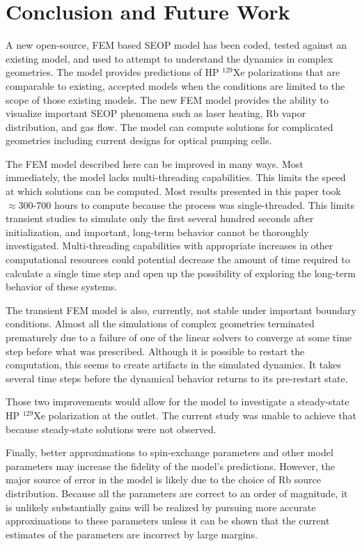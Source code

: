 \section{Conclusion and Future Work\label{sec:conclusion}}
A new open-source, FEM based SEOP model has been coded, tested against an existing model, and used to attempt to understand the dynamics in complex geometries. The model provides predictions of HP $^{129}$Xe polarizations that are comparable to existing, accepted models when the conditions are limited to the scope of those existing models. The new FEM model provides the ability to visualize important SEOP phenomena such as laser heating, Rb vapor distribution, and gas flow. The model can compute solutions for complicated geometries including current designs for optical pumping cells.

The FEM model described here can be improved in many ways. Most immediately, the model lacks multi-threading capabilities. This limits the speed at which solutions can be computed. Most results presented in this paper took $\approx$300-700 hours to compute because the process was single-threaded. This limits transient studies to simulate only the first several hundred seconds after initialization, and important, long-term behavior cannot be thoroughly investigated. Multi-threading capabilities with appropriate increases in other computational resources could potential decrease the amount of time required to calculate a single time step and open up the possibility of exploring the long-term behavior of these systems.

The transient FEM model is also, currently, not stable under important boundary conditions. Almost all the simulations of complex geometries terminated prematurely due to a failure of one of the linear solvers to converge at some time step before what was prescribed. Although it is possible to restart the computation, this seems to create artifacts in the simulated dynamics. It takes several time steps before the dynamical behavior returns to its pre-restart state. 

Those two improvements would allow for the model to investigate a steady-state HP $^{129}$Xe polarization at the outlet. The current study was unable to achieve that because steady-state solutions were not observed.

Finally, better approximations to spin-exchange parameters and other model parameters may increase the fidelity of the model's predictions. However, the major source of error in the model is likely due to the choice of Rb source distribution. Because all the parameters are correct to an order of magnitude, it is unlikely substantially gains will be realized by pursuing more accurate approximations to these parameters unless it can be shown that the current estimates of the parameters are incorrect by large margins.

